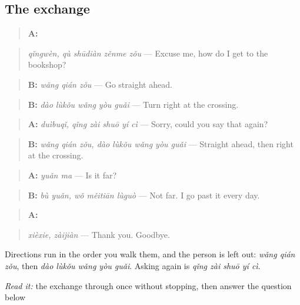\subsection*{The exchange}
\begin{quote}
\textbf{A:}  
\end{quote}

\begin{quote}
\emph{qǐngwèn, qù shūdiàn zěnme zǒu} — Excuse me, how do I get to the bookshop?
\end{quote}

\begin{quote}
\textbf{B:} \emph{wǎng qián zǒu} — Go straight ahead.
\end{quote}

\begin{quote}
\textbf{B:} \emph{dào lùkǒu wǎng yòu guǎi} — Turn right at the crossing.
\end{quote}

\begin{quote}
\textbf{A:} \emph{duìbuqǐ, qǐng zài shuō yí cì} — Sorry, could you say that again?
\end{quote}

\begin{quote}
\textbf{B:} \emph{wǎng qián zǒu, dào lùkǒu wǎng yòu guǎi} — Straight ahead, then right at the crossing.
\end{quote}

\begin{quote}
\textbf{A:} \emph{yuǎn ma} — Is it far?
\end{quote}

\begin{quote}
\textbf{B:} \emph{bù yuǎn, wǒ měitiān lùguò} — Not far. I go past it every day.
\end{quote}

\begin{quote}
\textbf{A:}  
\end{quote}

\begin{quote}
\emph{xièxie, zàijiàn} — Thank you. Goodbye.
\end{quote}

Directions run in the order you walk them, and the person is left out: \emph{wǎng qián zǒu}, then \emph{dào lùkǒu wǎng yòu guǎi}. Asking again is \emph{qǐng zài shuō yí cì}.

\begin{tcolorbox}[breakable,skin=enhanced,colback=orange!6,colframe=orange!45!black,boxrule=0.5pt,arc=1mm,left=6pt,right=6pt,top=4pt,bottom=4pt,fonttitle=\bfseries,title={Read this}]
\emph{Read it:} the exchange through once without stopping, then answer the question below
\end{tcolorbox}

